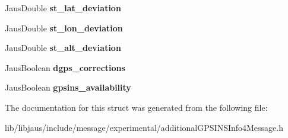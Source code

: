\begin{DoxyCompactItemize}
\item 
\hypertarget{struct_aditional_g_p_s_i_n_s_info4_message_struct_a18b2103af8c1327666b3d68fdab16032}{\-Jaus\-Double {\bfseries st\-\_\-lat\-\_\-deviation}}\label{struct_aditional_g_p_s_i_n_s_info4_message_struct_a18b2103af8c1327666b3d68fdab16032}

\item 
\hypertarget{struct_aditional_g_p_s_i_n_s_info4_message_struct_ab2696b81b95655b3bd2b9e24c2f53621}{\-Jaus\-Double {\bfseries st\-\_\-lon\-\_\-deviation}}\label{struct_aditional_g_p_s_i_n_s_info4_message_struct_ab2696b81b95655b3bd2b9e24c2f53621}

\item 
\hypertarget{struct_aditional_g_p_s_i_n_s_info4_message_struct_ad6686d6b007c03ecfb461895d32d5ff0}{\-Jaus\-Double {\bfseries st\-\_\-alt\-\_\-deviation}}\label{struct_aditional_g_p_s_i_n_s_info4_message_struct_ad6686d6b007c03ecfb461895d32d5ff0}

\item 
\hypertarget{struct_aditional_g_p_s_i_n_s_info4_message_struct_aded5ba4b119d428978f0cc1935b03c25}{\-Jaus\-Boolean {\bfseries dgps\-\_\-corrections}}\label{struct_aditional_g_p_s_i_n_s_info4_message_struct_aded5ba4b119d428978f0cc1935b03c25}

\item 
\hypertarget{struct_aditional_g_p_s_i_n_s_info4_message_struct_aee01f4855bd742d0bb6b09331bc6a271}{\-Jaus\-Boolean {\bfseries gpsins\-\_\-availability}}\label{struct_aditional_g_p_s_i_n_s_info4_message_struct_aee01f4855bd742d0bb6b09331bc6a271}

\end{DoxyCompactItemize}


\-The documentation for this struct was generated from the following file\-:\begin{DoxyCompactItemize}
\item 
lib/libjaus/include/message/experimental/additional\-G\-P\-S\-I\-N\-S\-Info4\-Message.\-h\end{DoxyCompactItemize}
